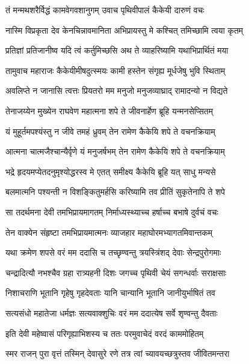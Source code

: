 
\twolineshloka
{तं मन्मथशरैर्विद्धं कामवेगवशानुगम्}
{उवाच पृथिवीपालं कैकेयी दारुणं वचः} %

\twolineshloka
{नास्मि विप्रकृता देव केनचिन्नावमानिता}
{अभिप्रायस्तु मे कश्चित् तमिच्छामि त्वया कृतम्} %

\twolineshloka
{प्रतिज्ञां प्रतिजानीष्व यदि त्वं कर्तुमिच्छसि}
{अथ ते व्याहरिष्यामि यथाभिप्रार्थितं मया} %

\twolineshloka
{तामुवाच महाराजः कैकेयीमीषदुत्स्मयः}
{कामी हस्तेन संगृह्य मूर्धजेषु भुवि स्थिताम्} %

\twolineshloka
{अवलिप्ते न जानासि त्वत्तः प्रियतरो मम}
{मनुजो मनुजव्याघ्राद् रामादन्यो न विद्यते} %

\twolineshloka
{तेनाजय्येन मुख्येन राघवेण महात्मना}
{शपे ते जीवनार्हेण ब्रूहि यन्मनसेप्सितम्} %

\twolineshloka
{यं मुहूर्तमपश्यंस्तु न जीवे तमहं ध्रुवम्}
{तेन रामेण कैकेयि शपे ते वचनक्रियाम्} %

\twolineshloka
{आत्मना चात्मजैश्चान्यैर्वृणे यं मनुजर्षभम्}
{तेन रामेण कैकेयि शपे ते वचनक्रियाम्} %

\twolineshloka
{भद्रे हृदयमप्येतदनुमृश्योद्धरस्व मे}
{एतत् समीक्ष्य कैकेयि ब्रूहि यत् साधु मन्यसे} %

\twolineshloka
{बलमात्मनि पश्यन्ती न विशङ्कितुमर्हसि}
{करिष्यामि तव प्रीतिं सुकृतेनापि ते शपे} %

\twolineshloka
{सा तदर्थमना देवी तमभिप्रायमागतम्}
{निर्माध्यस्थ्याच्च हर्षाच्च बभाषे दुर्वचं वचः} %

\twolineshloka
{तेन वाक्येन संहृष्टा तमभिप्रायमात्मनः}
{व्याजहार महाघोरमभ्यागतमिवान्तकम्} %

\twolineshloka
{यथा क्रमेण शपसे वरं मम ददासि च}
{तच्छृण्वन्तु त्रयस्त्रिंशद् देवाः सेन्द्रपुरोगमाः} %

\twolineshloka
{चन्द्रादित्यौ नभश्चैव ग्रहा रात्र्यहनी दिशः}
{जगच्च पृथिवी चेयं सगन्धर्वाः सराक्षसाः} %

\twolineshloka
{निशाचराणि भूतानि गृहेषु गृहदेवताः}
{यानि चान्यानि भूतानि जानीयुर्भाषितं तव} %

\twolineshloka
{सत्यसंधो महातेजा धर्मज्ञः सत्यवाक्शुचिः}
{वरं मम ददात्येष सर्वे शृण्वन्तु दैवताः} %

\twolineshloka
{इति देवी महेष्वासं परिगृह्याभिशस्य च}
{ततः परमुवाचेदं वरदं काममोहितम्} %

\twolineshloka
{स्मर राजन् पुरा वृत्तं तस्मिन् देवासुरे रणे}
{तत्र त्वां च्यावयच्छत्रुस्तव जीवितमन्तरा} %

